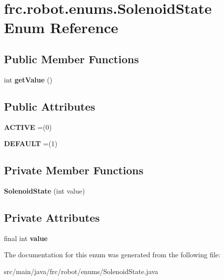 \hypertarget{enumfrc_1_1robot_1_1enums_1_1_solenoid_state}{}\section{frc.\+robot.\+enums.\+Solenoid\+State Enum Reference}
\label{enumfrc_1_1robot_1_1enums_1_1_solenoid_state}
\subsection*{Public Member Functions}
\begin{DoxyCompactItemize}
\item 
\mbox{\label{enumfrc_1_1robot_1_1enums_1_1_solenoid_state_ace6911d596cfd2344147d485c1b3dace}} 
int {\bfseries get\+Value} ()
\end{DoxyCompactItemize}
\subsection*{Public Attributes}
\begin{DoxyCompactItemize}
\item 
\mbox{\label{enumfrc_1_1robot_1_1enums_1_1_solenoid_state_a9ada6275f4d52489183d0594152c123b}} 
{\bfseries A\+C\+T\+I\+VE} =(0)
\item 
\mbox{\label{enumfrc_1_1robot_1_1enums_1_1_solenoid_state_ab9f1f7c2db26e4b556fe74cb60aec41d}} 
{\bfseries D\+E\+F\+A\+U\+LT} =(1)
\end{DoxyCompactItemize}
\subsection*{Private Member Functions}
\begin{DoxyCompactItemize}
\item 
\mbox{\label{enumfrc_1_1robot_1_1enums_1_1_solenoid_state_a153f58e13281d833889782a06345e1cb}} 
{\bfseries Solenoid\+State} (int value)
\end{DoxyCompactItemize}
\subsection*{Private Attributes}
\begin{DoxyCompactItemize}
\item 
\mbox{\label{enumfrc_1_1robot_1_1enums_1_1_solenoid_state_aeff030ac5e4c596ec1de1c4e1e3746cc}} 
final int {\bfseries value}
\end{DoxyCompactItemize}


The documentation for this enum was generated from the following file\+:\begin{DoxyCompactItemize}
\item 
src/main/java/frc/robot/enums/Solenoid\+State.\+java\end{DoxyCompactItemize}
